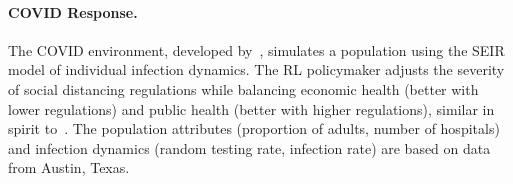 

\paragraph{COVID Response.}
The COVID environment, developed by~\citet{kompella2020pandemic}, simulates a population using the SEIR model of individual infection dynamics. The RL policymaker adjusts the severity of social distancing regulations while balancing economic health (better with lower regulations) and public health (better with higher regulations), similar in spirit to~\citet{trott2021aieconomist}. The population attributes (proportion of adults, number of hospitals) and infection dynamics (random testing rate, infection rate) are based on data from Austin, Texas.


